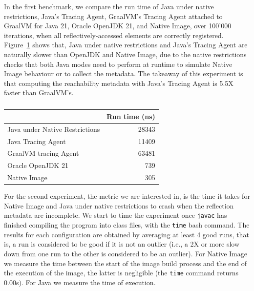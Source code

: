 In the first benchmark, we compare the run time of Java under native restrictions, Java's Tracing Agent, GraalVM's Tracing Agent attached to GraalVM for Java 21, Oracle OpenJDK 21, and Native Image, over 100'000 iterations, when all reflectively-accessed elements are correctly registered. 
Figure~\ref{tab:benchmark_1} shows that, Java under native restrictions and Java's Tracing Agent are naturally slower than OpenJDK and Native Image, due to the native restrictions checks that both Java modes need to perform at runtime to simulate Native Image behaviour or to collect the metadata. The takeaway of this experiment is that computing the reachability metadata with Java's Tracing Agent is 5.5X faster than GraalVM's.

\begin{table}[ht]
\centering
\begin{tabular}{@{}lr@{}}
\toprule
                               & \multicolumn{1}{l}{Run time (ns)} \\ \midrule
Java under Native Restrictions & 28343                             \\
Java Tracing Agent             & 11409                             \\
GraalVM tracing Agent          & 63481                             \\
Oracle OpenJDK 21              & 739                               \\
Native Image                   & 305                               \\ \bottomrule
\end{tabular}
\caption{}
\label{tab:benchmark_1}
\end{table}

For the second experiment, the metric we are interested in, is the time it takes for Native Image and Java under native restrictions to crash when the reflection metadata are incomplete. 
We start to time the experiment once \verb|javac| has finished compiling the program into class files, with the \verb|time| bash command. 
The results for each configuration are obtained by averaging at least 4 good runs, that is, a run is considered to be good if it is not an outlier (i.e., a 2X or more slow down from one run to the other is considered to be an outlier).
For Native Image we measure the time between the start of the image build process and the end of the execution of the image, the latter is negligible (the \verb|time| command returns 0.00s). For Java we measure the time of execution.


